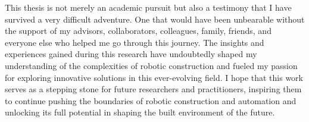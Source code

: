 \documentclass[11pt]{book}
\begin{document}
This thesis is not merely an academic pursuit but also a testimony that I have survived a very difficult adventure. One that would have been unbearable without the support of my advisors, collaborators, colleagues, family, friends, and everyone else who helped me go through this journey. The insights and experiences gained during this research have undoubtedly shaped my understanding of the complexities of robotic construction and fueled my passion for exploring innovative solutions in this ever-evolving field. I hope that this work serves as a stepping stone for future researchers and practitioners, inspiring them to continue pushing the boundaries of robotic construction and automation and unlocking its full potential in shaping the built environment of the future. 
\end{document}
